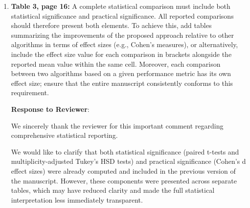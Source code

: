 \documentclass[12pt,letterpaper]{article}
\begin{document}
\begin{enumerate}
\begin{enumerate}
\item \textbf{Clarification on Reported Comparisons:}

Although one-way ANOVA followed by Tukey’s HSD computes all possible pairwise comparisons among models, for clarity and relevance to the study objective, we report only comparisons against the predefined reference baseline (MNSeg-Net for DSC analysis and clinician-annotated CSA for CSA analysis). All reported $p$-values are multiplicity-adjusted and derived from the full Tukey HSD procedure applied across all models. Benchmark-to-benchmark comparisons were not included, as they are not central to the study’s primary objective of evaluating performance relative to the proposed method and clinical reference.

\end{enumerate}





















    
    \item \textbf{Table 3, page 16:} A complete statistical comparison must include both statistical significance and practical significance. All reported comparisons should therefore present both elements. To achieve this, add tables summarizing the improvements of the proposed approach relative to other algorithms in terms of effect sizes (e.g., Cohen's measures), or alternatively, include the effect size value for each comparison in brackets alongside the reported mean value within the same cell. Moreover, each comparison between two algorithms based on a given performance metric has its own effect size; ensure that the entire manuscript consistently conforms to this requirement.



\textbf{Response to Reviewer}:

We sincerely thank the reviewer for this important comment regarding comprehensive statistical reporting.

We would like to clarify that both statistical significance (paired t-tests and multiplicity-adjusted Tukey’s HSD tests) and practical significance (Cohen’s d effect sizes) were already computed and included in the previous version of the manuscript. However, these components were presented across separate tables, which may have reduced clarity and made the full statistical interpretation less immediately transparent.


\end{enumerate}
\end{document}
